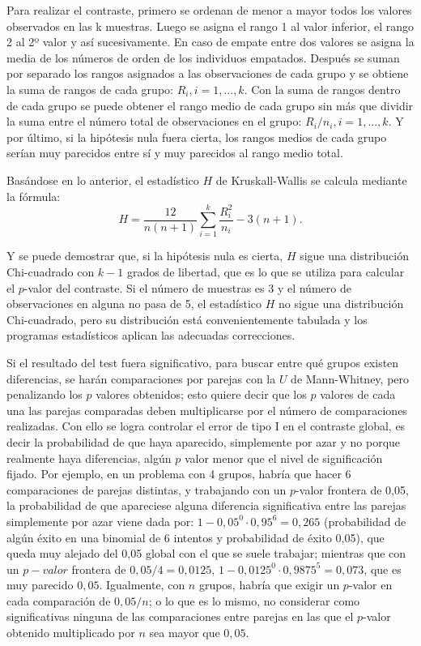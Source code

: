 \begin{description}
Para realizar el contraste, primero se ordenan de menor a mayor todos los valores observados en las k muestras. Luego se asigna el rango 1 al valor inferior, el rango 2 al 2º valor y así sucesivamente. En caso de empate entre dos valores se asigna la media de los números de orden de los individuos empatados. Después se suman por separado los rangos asignados a las observaciones de cada grupo y se obtiene la suma de rangos de cada grupo: $R_i, i=1,...,k$. Con la suma de rangos dentro de cada grupo se puede obtener el rango medio de cada grupo sin más que dividir la suma entre el número total de observaciones en el grupo: $R_{i}/n_i, i=1,...,k$. Y por último, si la hipótesis nula fuera cierta, los rangos medios de cada grupo serían muy parecidos entre sí y muy parecidos al rango medio total.

Basándose en lo anterior, el estadístico $H$ de Kruskall-Wallis se calcula mediante la fórmula:
\[
H = \frac{12}{n(n+1)}\sum_{i=1}^k \frac{R_i^2}{n_i}-3(n+1).
\]

Y se puede demostrar que, si la hipótesis nula es cierta, $H$ sigue una distribución Chi-cuadrado con $k-1$ grados de libertad, que es lo que se utiliza para calcular el $p$-valor del contraste. Si el número de muestras es 3 y el número de observaciones en alguna no pasa de 5, el estadístico $H$ no sigue una distribución Chi-cuadrado, pero su distribución está convenientemente tabulada y los programas estadísticos aplican las adecuadas correcciones.

Si el resultado del test fuera significativo, para buscar entre qué grupos existen diferencias, se harán comparaciones por parejas con la $U$ de Mann-Whitney, pero penalizando los $p$ valores obtenidos; esto quiere decir que los $p$ valores de cada una las parejas comparadas deben multiplicarse por el número de comparaciones realizadas. Con ello se logra controlar el error de tipo I en el contraste global, es decir la probabilidad de que haya aparecido, simplemente por azar y no porque realmente haya diferencias, algún $p$ valor menor que el nivel de significación fijado. Por ejemplo, en un problema con 4 grupos, habría que hacer 6 comparaciones de parejas distintas, y trabajando con un $p$-valor frontera de 0,05, la probabilidad de que apareciese alguna diferencia significativa entre las parejas simplemente por azar viene dada por: $1-0,05^0\cdot0,95^6=0,265$ (probabilidad de algún éxito en una binomial de 6 intentos y probabilidad de éxito 0,05), que queda muy alejado del 0,05 global con el que se suele trabajar; mientras que con un $p-valor$ frontera de $0,05/4=0,0125$, $1-0,0125^0\cdot0,9875^5=0,073$, que es muy parecido $0,05$. Igualmente, con $n$ grupos, habría que exigir un $p$-valor en cada comparación de $0,05/n$; o lo que es lo mismo, no considerar como significativas ninguna de las comparaciones entre parejas en las que el $p$-valor obtenido multiplicado por $n$ sea mayor que $0,05$.



\end{description}
